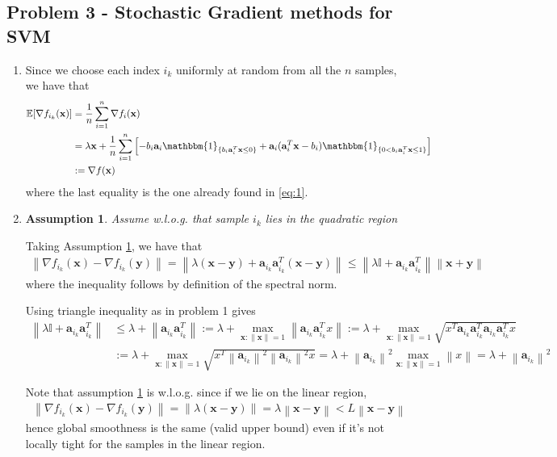 \documentclass[letterpaper]{article}
\renewcommand{\aa}{\mathbf{a}}
\providecommand{\xx}{\mathbf{x}}
\providecommand{\yy}{\mathbf{y}}
\providecommand{\1}{\mathbf{1}}
\providecommand{\0}{\mathbf{0}}
\providecommand{\norm}[1]{\ensuremath{\left\lVert#1\right\rVert}}
\newtheorem{assumption}{Assumption}
\newcommand{\E}{\mathbb{E}}
\begin{document}
\subsection*{Problem 3 - Stochastic Gradient methods for SVM}
\begin{enumerate}[label=(\alph*)]
    \item
    Since we choose each index $i_k$ uniformly at random from all the $n$ samples, we have that
    \begin{align}
        \E[\nabla f_{i_k}(\xx)] &= \frac{1}{n} \sum_{i=1}^{n} \nabla f_i(\xx) \\
        &= \lambda \xx + \frac{1}{n}\sum_{i=1}^n \left[ -b_i \aa_i\mathbbm{1}_{\{b_i \aa_i^T \xx  \leq 0\}} + \aa _i(\aa_i^T \xx - b_i )\mathbbm{1}_{\{0<b_i \aa_i^T \xx\leq 1\}} \right] \\
        &:= \nabla f(\xx)
    \end{align}
    where the last equality is the one already found in \eqref{eq:1}.
    
    \item
    \begin{assumption}
        Assume w.l.o.g. that sample $i_k$ lies in the quadratic region
        \label{as:1}
    \end{assumption}
    
    Taking Assumption \ref{as:1}, we have that
    \begin{align}
        \norm{\nabla f_{i_k}(\xx) - \nabla f_{i_k}(\yy)} = \norm{\lambda(\xx - \yy) + \aa_{i_k} \aa_{i_k}^T (\xx - \yy)} \leq \norm{\lambda\mathbb{I} + \aa_{i_k} \aa_{i_k}^T}\norm{\xx + \yy}
    \end{align}
    where the inequality follows by definition of the spectral norm.
    
    Using triangle inequality as in problem 1 gives
    \begin{align}
        \norm{\lambda\mathbb{I} + \aa_{i_k} \aa_{i_k}^T} &\leq \lambda + \norm{\aa_{i_k} \aa_{i_k}^T} := \lambda + \max_{\xx:\norm{\xx}=1} \norm{\aa_{i_k} \aa_{i_k}^T x} := \lambda + \max_{\xx:\norm{\xx}=1} \sqrt{x^T \aa_{i_k} \aa_{i_k} ^T \aa_{i_k} \aa_{i_k}^T x} \\
        &:=\lambda + \max_{\xx:\norm{\xx}=1} \sqrt{x^T \norm{\aa_{i_k}} ^2 \norm{\aa_{i_k}} ^2 x} = \lambda + \norm{\aa_{i_k}} ^2 \max_{\xx:\norm{\xx}=1} \norm{x} = \lambda + \norm{\aa_{i_k}} ^2
    \end{align}
    
    Note that assumption \ref{as:1} is w.l.o.g. since if we lie on the linear region,
    \begin{align}
        \norm{\nabla f_{i_k}(\xx) - \nabla f_{i_k}(\yy)} = \norm{\lambda(\xx - \yy)} = \lambda \norm{\xx-\yy} < L\norm{\xx-\yy}
    \end{align}
    hence global smoothness is the same (valid upper bound) even if it's not locally tight for the samples in the linear region.
    
\end{enumerate}
\end{document}
